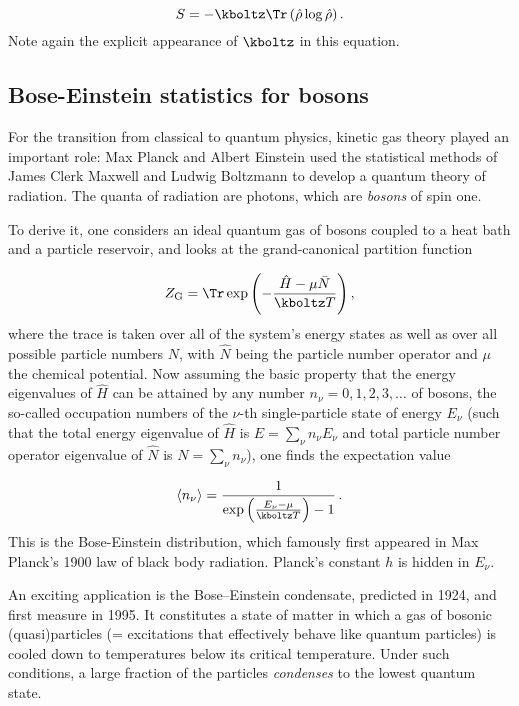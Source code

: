\begin{equation*}
  S=-\kboltz \Tr \left( \hat \rho \log \hat \rho \right).
\end{equation*}
%
Note again the explicit appearance of $\kboltz$ in this equation.


\subsection*{Bose-Einstein statistics for bosons}

For the transition from classical to quantum physics, kinetic gas theory played an important role: Max Planck and Albert Einstein used the statistical methods of James Clerk Maxwell and Ludwig Boltzmann to develop a quantum theory of radiation. The quanta of radiation are photons, which are \emph{bosons} of spin one.

To derive it, one considers an ideal quantum gas of bosons coupled to a heat bath and a particle reservoir, and looks at the grand-canonical partition function

\begin{equation*}
  Z_{\mathrm{G}}=\Tr \exp\left(-\frac{\hat H-\mu \bar N}{\kboltz T} \right),
\end{equation*}
%
where the trace is taken over all of the system's energy states as well as over all possible particle numbers $N$, with $\hat N$ being the particle number operator and $\mu$ the chemical potential. Now assuming the basic property that the energy eigenvalues of $\hat H$ can be attained by any number $n_\nu=0,1,2,3, \ldots$ of bosons, the so-called occupation numbers of the $\nu$-th single-particle state of energy $E_\nu$ (such that the total energy eigenvalue of $\hat H$ is $E=\sum_\nu n_\nu E_\nu$ and total particle number operator eigenvalue of $\hat N$ is $N=\sum_\nu n_\nu$), one finds the expectation value

\begin{equation*}
  \langle n_\nu \rangle=
    \frac{1}{\exp\left(\frac{E_\nu-\mu}{\kboltz T} \right)-1}\,.
\end{equation*}
%
This is the Bose-Einstein distribution, which famously first appeared in Max Planck's 1900 law of black body radiation. Planck's constant $h$ is hidden in $E_\nu$.

An exciting application is the Bose–Einstein condensate, predicted in 1924, and first measure in 1995. It constitutes a state of matter in which a gas of bosonic (quasi)particles (= excitations that effectively behave like quantum particles) is cooled down to temperatures below its critical temperature. Under such conditions, a large fraction of the particles \emph{condenses} to the lowest quantum state.



